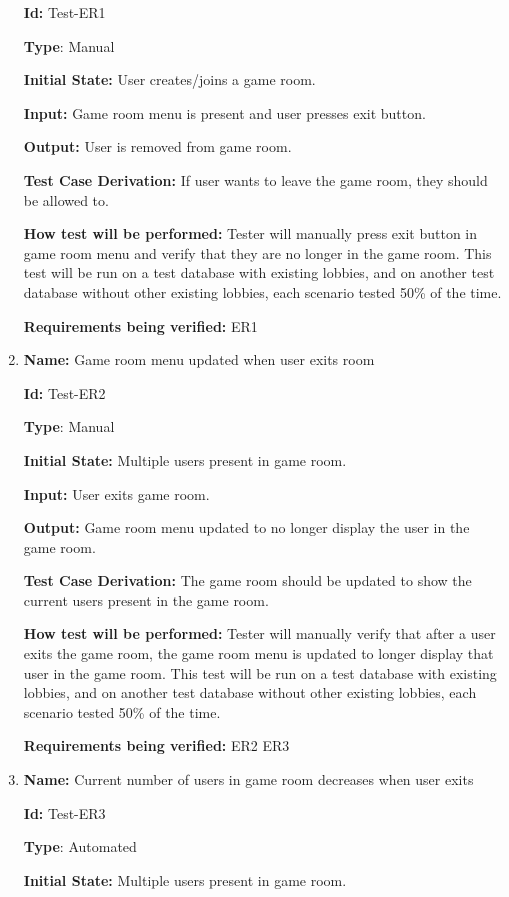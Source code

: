 \documentclass[12pt, titlepage]{article}
\begin{document}
\begin{enumerate}
\textbf{Id:} Test-ER1

\textbf{Type}: Manual

\textbf{Initial State:} User creates/joins a game room.

\textbf{Input:} Game room menu is present and user presses exit button.

\textbf{Output:} User is removed from game room.

\textbf{Test Case Derivation:} If user wants to leave the game room, they should be allowed to.

\textbf{How test will be performed:} Tester will manually press exit button in game room menu and verify that they are no longer in the game room. This test will be run on a test database with existing lobbies, and on another test database without other existing lobbies, each scenario tested 50\% of the time.

\textbf{Requirements being verified: } ER1

\item{\textbf{Name:} Game room menu updated when user exits room} \label{itm:Test-ER2}

\textbf{Id:} Test-ER2

\textbf{Type}: Manual

\textbf{Initial State:} Multiple users present in game room.

\textbf{Input:} User exits game room.

\textbf{Output:} Game room menu updated to no longer display the user in the game room.

\textbf{Test Case Derivation:} The game room should be updated to show the current users present in the game room.

\textbf{How test will be performed:} Tester will manually verify that after a user exits the game room, the game room menu is updated to longer display that user in the game room. This test will be run on a test database with existing lobbies, and on another test database without other existing lobbies, each scenario tested 50\% of the time.

\textbf{Requirements being verified: } ER2 ER3

\item{\textbf{Name:} Current number of users in game room decreases when user exits} \label{itm:Test-ER3}

\textbf{Id:} Test-ER3

\textbf{Type}: Automated

\textbf{Initial State:} Multiple users present in game room.


\end{enumerate}
\end{document}
